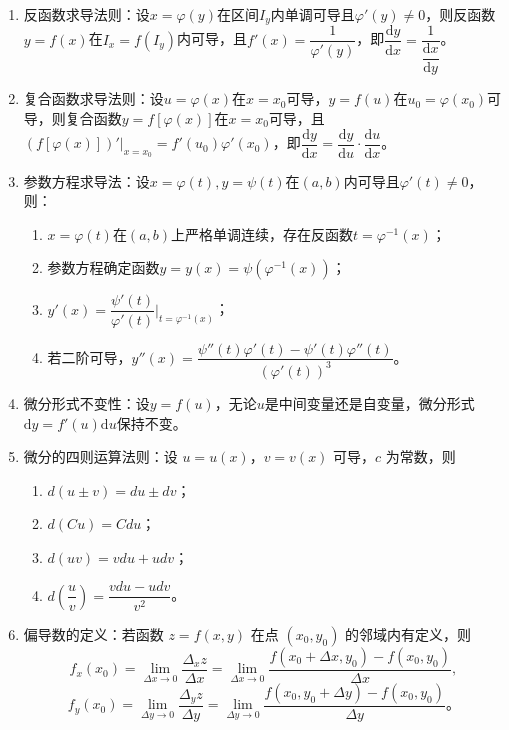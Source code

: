 \documentclass[UTF8]{ctexart}
\theoremstyle{remark}
\begin{document}
\begin{enumerate}
	\item 反函数求导法则：设$x = \varphi(y)$在区间$I_y$内单调可导且$\varphi'(y) \neq 0$，则反函数$y = f(x)$在$I_x = f(I_y)$内可导，且$f'(x) = \dfrac{1}{\varphi'(y)}$，即$\dfrac{\mathrm{d}y}{\mathrm{d}x} = \dfrac{1}{\dfrac{\mathrm{d}x}{\mathrm{d}y}}$。
	
	\item 复合函数求导法则：设$u = \varphi(x)$在$x=x_0$可导，$y = f(u)$在$u_0 = \varphi(x_0)$可导，则复合函数$y = f[\varphi(x)]$在$x=x_0$可导，且$(f[\varphi(x)])'|_{x=x_0} = f'(u_0)\varphi'(x_0)$，即$\dfrac{\mathrm{d}y}{\mathrm{d}x} = \dfrac{\mathrm{d}y}{\mathrm{d}u} \cdot \dfrac{\mathrm{d}u}{\mathrm{d}x}$。
	
	\item 参数方程求导法：设$x = \varphi(t), y = \psi(t)$在$(a,b)$内可导且$\varphi'(t) \neq 0$，则：
	\begin{enumerate}
		\item $x = \varphi(t)$在$(a,b)$上严格单调连续，存在反函数$t = \varphi^{-1}(x)$；
		\item 参数方程确定函数$y = y(x) = \psi(\varphi^{-1}(x))$；
		\item $y'(x) = \dfrac{\psi'(t)}{\varphi'(t)}|_{t=\varphi^{-1}(x)}$；
		\item 若二阶可导，$y''(x) = \dfrac{\psi''(t)\varphi'(t) - \psi'(t)\varphi''(t)}{(\varphi'(t))^3}$。
	\end{enumerate}
	
	\item 微分形式不变性：设$y = f(u)$，无论$u$是中间变量还是自变量，微分形式$\mathrm{d}y = f'(u)\mathrm{d}u$保持不变。

	
	\item 微分的四则运算法则：设 \(u=u(x)\)，\(v=v(x)\) 可导，\(c\) 为常数，则
	\begin{enumerate}
		\item \(d(u \pm v) = du \pm dv\)；
		\item \(d(Cu) = Cdu\)；
		\item \(d(uv) = vdu + udv\)；
		\item \(d\left(\dfrac{u}{v}\right) = \dfrac{vdu - udv}{v^2}\)。
	\end{enumerate}
	
	\item 偏导数的定义：若函数 \(z = f(x, y)\) 在点 \((x_0, y_0)\) 的邻域内有定义，则
	\[
	f_x(x_0) = \lim_{\Delta x \to 0} \frac{\Delta_x z}{\Delta x} = \lim_{\Delta x \to 0} \frac{f(x_0 + \Delta x, y_0) - f(x_0, y_0)}{\Delta x},
	\]
	\[
	f_y(x_0) = \lim_{\Delta y \to 0} \frac{\Delta_y z}{\Delta y} = \lim_{\Delta y \to 0} \frac{f(x_0, y_0 + \Delta y) - f(x_0, y_0)}{\Delta y}。
	\]
	

\end{enumerate}
\end{document}
